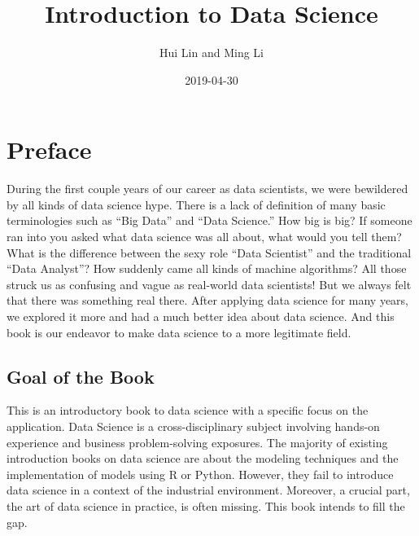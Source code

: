 \documentclass[12pt,]{krantz}
\title{Introduction to Data Science}
\author{Hui Lin and Ming Li}
\date{2019-04-30}
\theoremstyle{definition}
\theoremstyle{definition}
\theoremstyle{definition}
\theoremstyle{remark}
\begin{document}
\maketitle

\thispagestyle{empty}
\begin{center}
\end{center}

\setlength{\abovedisplayskip}{-5pt}
\setlength{\abovedisplayshortskip}{-5pt}

{
\hypersetup{linkcolor=black}
\setcounter{tocdepth}{2}
\tableofcontents
}
\listoftables
\listoffigures
\chapter*{Preface}\label{preface}


During the first couple years of our career as data scientists, we were
bewildered by all kinds of data science hype. There is a lack of
definition of many basic terminologies such as ``Big Data'' and ``Data
Science.'' How big is big? If someone ran into you asked what data
science was all about, what would you tell them? What is the difference
between the sexy role ``Data Scientist'' and the traditional ``Data
Analyst''? How suddenly came all kinds of machine algorithms? All those
struck us as confusing and vague as real-world data scientists! But we
always felt that there was something real there. After applying data
science for many years, we explored it more and had a much better idea
about data science. And this book is our endeavor to make data science
to a more legitimate field.

\section*{Goal of the Book}\label{goal-of-the-book}


This is an introductory book to data science with a specific focus on
the application. Data Science is a cross-disciplinary subject involving
hands-on experience and business problem-solving exposures. The majority
of existing introduction books on data science are about the modeling
techniques and the implementation of models using R or Python. However,
they fail to introduce data science in a context of the industrial
environment. Moreover, a crucial part, the art of data science in
practice, is often missing. This book intends to fill the gap.
\end{document}
